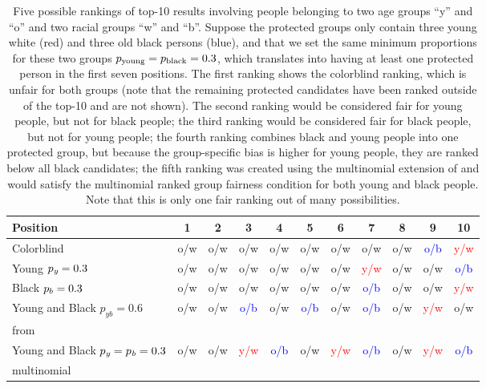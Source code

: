 \begin{table}[t]
	\caption[Introductory example for the extension of \algoFAIR to multiple protected groups]{Five possible rankings of top-10 results involving people belonging to two age groups ``y'' and ``o'' and two racial groups ``w'' and ``b''.
		Suppose the protected groups only contain three young white (red) and three old black persons (blue), and that we set the same minimum proportions for these two groups $p_{\text{young}} = p_{\text{black}} = 0.3$, which translates into having at least one protected person in the first seven positions.
		The first ranking shows the colorblind ranking, which is unfair for both groups (note that the remaining protected candidates have been ranked outside of the top-10 and are not shown).
		The second ranking would be considered fair for young people, but not for black people; the third ranking would be considered fair for black people, but not for young people; the fourth ranking combines black and young people into one protected group, but because the group-specific bias is higher for young people, they are ranked below all black candidates; the fifth ranking was created using the multinomial extension of \algoFAIR and would satisfy the multinomial ranked group fairness condition for both young and black people.
		Note that this is only one fair ranking out of many possibilities.
		\label{tbl:multinomial_intro_example}}
	\centering\begin{tabular}{lcccccccccc}\toprule
		Position & 1 &2 & 3 &4& 5& 6& 7& 8& 9& 10  \\
		\midrule
		\rowcolor[HTML]{C0C0C0}
		Colorblind & o/w & o/w & o/w & o/w & o/w & o/w & o/w & o/w & \textcolor{blue}{o/b} & \textcolor{red}{y/w} \\
		Young $p_\textit{y}=0.3$ & o/w &o/w& o/w& o/w& o/w& o/w& \textcolor{red}{y/w}& o/w & o/w & \textcolor{blue}{o/b} \\
		\rowcolor[HTML]{C0C0C0}
		Black $p_b=0.3$ & o/w &o/w &o/w& o/w &o/w &o/w& \textcolor{blue}{o/b}& o/w& o/w& \textcolor{red}{y/w} \\
		Young and Black $p_{\textit{yb}}=0.6$& o/w &o/w& \textcolor{blue}{o/b} & o/w& \textcolor{blue}{o/b}& o/w & \textcolor{blue}{o/b}& o/w& \textcolor{red}{y/w}& o/w \\
		\algoFAIR from~\cite{zehlike2017fair} &&&&&&&&&&\\
		\rowcolor[HTML]{C0C0C0}
		Young and Black $p_{\textit{y}} = p_{\textit{b}} = 0.3$& o/w& o/w &\textcolor{red}{y/w}& \textcolor{blue}{o/b}& o/w& \textcolor{red}{y/w} &\textcolor{blue}{o/b}& o/w& \textcolor{red}{y/w}& \textcolor{blue}{o/b} \\
		\rowcolor[HTML]{C0C0C0}
		multinomial \algoFAIR &&&&&&&&&&\\
		\bottomrule
	\end{tabular}
\end{table}

